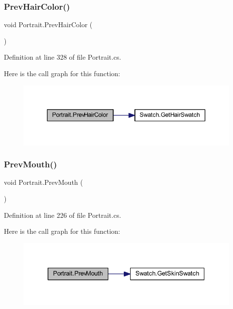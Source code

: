 \subsubsection{\texorpdfstring{PrevHairColor()}{PrevHairColor()}}
{\footnotesize\ttfamily void Portrait.\+Prev\+Hair\+Color (\begin{DoxyParamCaption}{ }\end{DoxyParamCaption})}



Definition at line 328 of file Portrait.\+cs.

Here is the call graph for this function\+:
\nopagebreak
\begin{figure}[H]
\begin{center}
\leavevmode
\includegraphics[width=343pt]{class_portrait_a29b9670f2b653ffe43cf81e94e90062a_cgraph}
\end{center}
\end{figure}
\mbox{\label{class_portrait_ac81c66115ce3df6a35af825e43742211}} 
\subsubsection{\texorpdfstring{PrevMouth()}{PrevMouth()}}
{\footnotesize\ttfamily void Portrait.\+Prev\+Mouth (\begin{DoxyParamCaption}{ }\end{DoxyParamCaption})}



Definition at line 226 of file Portrait.\+cs.

Here is the call graph for this function\+:
\nopagebreak
\begin{figure}[H]
\begin{center}
\leavevmode
\includegraphics[width=332pt]{class_portrait_ac81c66115ce3df6a35af825e43742211_cgraph}
\end{center}
\end{figure}
\mbox{\label{class_portrait_afc5cd84e6086e462adb30f0d988c76b6}} 
